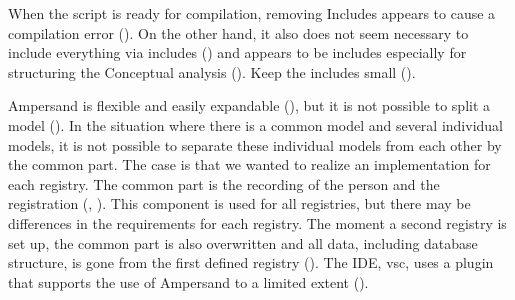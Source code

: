 When the script is ready for compilation, removing Includes appears to cause a compilation error ().
On the other hand, it also does not seem necessary to include everything via includes () and appears to be includes especially for structuring the Conceptual analysis ().
Keep the includes small ().
\label{s:3_2_common_objects}

Ampersand is flexible and easily expandable (), but it is not possible to split a model ().
In the situation where there is a common model and several individual models, it is not possible to separate these individual models from each other by the common part.
The case is that we wanted to realize an implementation for each registry.
The common part is the recording of the person and the registration (, ).
This component is used for all registries, but there may be differences in the requirements for each registry.
The moment a second registry is set up, the common part is also overwritten and all data, including database structure, is gone from the first defined registry ().
The IDE, \acrshort{vsc}, uses a plugin that supports the use of Ampersand to a limited extent ().
\label{s:3_3_crud}

